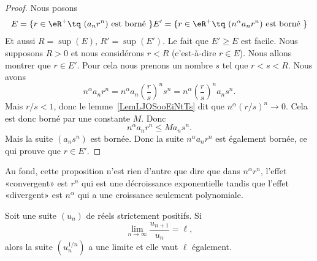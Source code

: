 \begin{proof}
	Nous posons
	\begin{subequations}
		\begin{align}
			E=\{ r\in \eR^+\tq \text{  } (a_nr^n)\text{ est borné } \}
			E'=\{ r\in \eR^+\tq \text{  } (n^{\alpha}a_nr^n)\text{ est borné } \}
		\end{align}
	\end{subequations}
	Et aussi \( R=\sup(E)\), \( R'=\sup(E')\). Le fait que \( E'\geq E\) est facile. Nous supposons \( R>0\) et nous considérons \( r<R\) (c'est-à-dire \( r\in E\)).  Nous allons montrer que \( r\in E'\). Pour cela nous prenons un nombre \( s\) tel que \( r<s<R\). Nous avons
	\begin{equation}
		n^{\alpha}a_nr^n=n^{\alpha}a_n\left( \frac{ r }{ s } \right)^ns^n=n^{\alpha}\left( \frac{ r }{ s } \right)^na_ns^n.
	\end{equation}
	Mais \( r/s<1\), donc le lemme~\ref{LemLJOSooEiNtTs} dit que \( n^{\alpha}(r/s)^n\to 0\). Cela est donc borné par une constante \( M\). Donc
	\begin{equation}
		n^{\alpha}a_nr^n\leq Ma_ns^n.
	\end{equation}
	Mais la suite \( (a_ns^n)\) est bornée. Donc la suite \( n^{\alpha}a_nr^n\) est également bornée, ce qui prouve que \( r\in E'\).
\end{proof}

\begin{remark}
	Au fond, cette proposition n'est rien d'autre que dire que dans \( n^\alpha r^n\), l'effet «convergent» est \( r^n\) qui est une décroissance exponentielle tandis que l'effet «divergent» est \( n^{\alpha}\) qui a une croissance seulement polynomiale.
\end{remark}

\begin{lemma}     \label{LEMooNAWTooHWqKBK}
	Soit une suite \( (u_n)\) de réels strictement positifs. Si
	\begin{equation}
		\lim_{n\to \infty} \frac{ u_{n+1} }{ u_n }=\ell,
	\end{equation}
	alors la suite \( (u_n^{1/n})\) a une limite et elle vaut \( \ell\) également.
\end{lemma}

